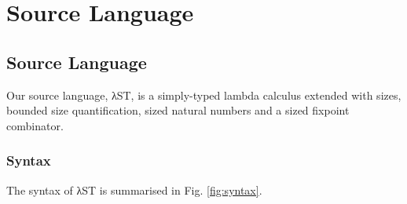 \chapter{Source Language}

\section{Source Language}

Our source language, λST, is a simply-typed lambda calculus extended with sizes,
bounded size quantification, sized natural numbers and a sized fixpoint
combinator.


\subsection{Syntax}

The syntax of λST is summarised in Fig. \ref{fig:syntax}.

